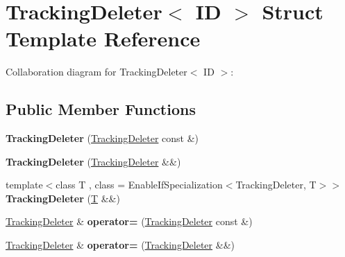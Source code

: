 \hypertarget{struct_tracking_deleter}{}\section{Tracking\+Deleter$<$ ID $>$ Struct Template Reference}
\label{struct_tracking_deleter}


Collaboration diagram for Tracking\+Deleter$<$ ID $>$\+:
\subsection*{Public Member Functions}
\begin{DoxyCompactItemize}
\item 
\mbox{\label{struct_tracking_deleter_a59fa5d623d4d7e3820bccc2524f8e275}} 
{\bfseries Tracking\+Deleter} (\mbox{\hyperlink{struct_tracking_deleter}{Tracking\+Deleter}} const \&)
\item 
\mbox{\label{struct_tracking_deleter_ae4c26c0851a588e434571dd68cfab293}} 
{\bfseries Tracking\+Deleter} (\mbox{\hyperlink{struct_tracking_deleter}{Tracking\+Deleter}} \&\&)
\item 
\mbox{\label{struct_tracking_deleter_a9662433603fc26bd5d04f2275114b2c2}} 
{\footnotesize template$<$class T , class  = Enable\+If\+Specialization$<$\+Tracking\+Deleter, T$>$$>$ }\\{\bfseries Tracking\+Deleter} (\mbox{\hyperlink{struct_t}{T}} \&\&)
\item 
\mbox{\label{struct_tracking_deleter_abaa0c5a565e58e8667b4ac13737ad13b}} 
\mbox{\hyperlink{struct_tracking_deleter}{Tracking\+Deleter}} \& {\bfseries operator=} (\mbox{\hyperlink{struct_tracking_deleter}{Tracking\+Deleter}} const \&)
\item 
\mbox{\label{struct_tracking_deleter_a0129438eadeb6d4a139a555696fdcbd7}} 
\mbox{\hyperlink{struct_tracking_deleter}{Tracking\+Deleter}} \& {\bfseries operator=} (\mbox{\hyperlink{struct_tracking_deleter}{Tracking\+Deleter}} \&\&)
\item 
\mbox{\label{struct_tracking_deleter_a640c59c2e95166d81a139e19e5092c78}} 

\end{DoxyCompactItemize}
